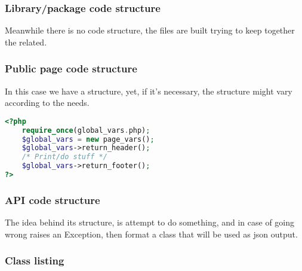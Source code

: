 \subsubsection[Library/package code structure]{Library/package code structure}
\begin{flushleft}
    Meanwhile there is no code structure, the files are built trying to keep together the related.
\end{flushleft}

\subsubsection[Public page code structure]{Public page code structure}
\begin{flushleft}
    In this case we have a structure, yet, if it's necessary, the structure might vary according to the needs.
\end{flushleft}
\begin{flushleft}
\begin{lstlisting}[language=php,label={lst:php_page_structure}]
<?php
    require_once(global_vars.php);
    $global_vars = new page_vars();
    $global_vars->return_header();
    /* Print/do stuff */
    $global_vars->return_footer();
?>
\end{lstlisting}
\end{flushleft}

\newpage
\subsubsection[API code structure]{API code structure}
\begin{flushleft}
    The idea behind its structure, is attempt to do something, and in case of going wrong raises an Exception, then format a class that will be used as json output.
\end{flushleft}


\newpage
\subsubsection[Main Class listing]{Class listing}

